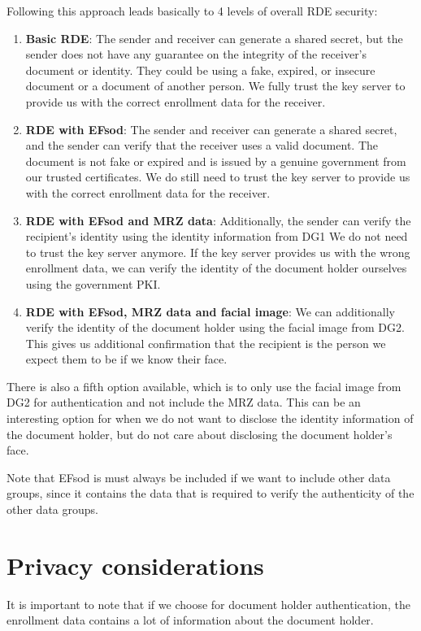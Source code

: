 Following this approach leads basically to 4 levels of overall RDE security:
\begin{enumerate}
    \item \textbf{Basic RDE}:
    The sender and receiver can generate a shared secret, but the sender does not have any guarantee on the integrity of the receiver's document or identity.
    They could be using a fake, expired, or insecure document or a document of another person.
    We fully trust the key server to provide us with the correct enrollment data for the receiver.
    \item \textbf{RDE with EFsod}:
    The sender and receiver can generate a shared secret, and the sender can verify that the receiver uses a valid document.
    The document is not fake or expired and is issued by a genuine government from our trusted certificates.
    We do still need to trust the key server to provide us with the correct enrollment data for the receiver.
    \item \textbf{RDE with EFsod and MRZ data}:
    Additionally, the sender can verify the recipient's identity using the identity information from DG1
    We do not need to trust the key server anymore.
    If the key server provides us with the wrong enrollment data, we can verify the identity of the document holder ourselves using the government PKI.
    \item \textbf{RDE with EFsod, MRZ data and facial image}:
    We can additionally verify the identity of the document holder using the facial image from DG2.
    This gives us additional confirmation that the recipient is the person we expect them to be if we know their face.
\end{enumerate}

There is also a fifth option available, which is to only use the facial image from DG2 for authentication and not include the MRZ data.
This can be an interesting option for when we do not want to disclose the identity information of the document holder, but do not care about disclosing the document holder's face.

Note that EFsod is must always be included if we want to include other data groups, since it contains the data that is required to verify the authenticity of the other data groups.

\section{Privacy considerations}\label{sec:privacy-considerations}
It is important to note that if we choose for document holder authentication, the enrollment data contains a lot of information about the document holder.

